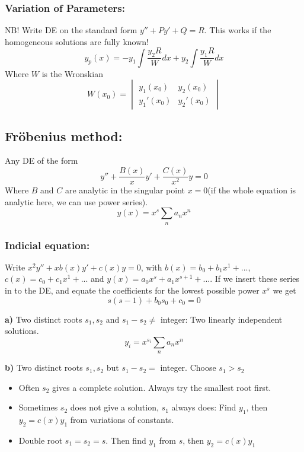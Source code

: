 \documentclass[a4paper,norsk, 10pt]{article}
\begin{document}
\subsubsection{Variation of Parameters:}
NB! Write DE on the standard form $y'' + Py' + Q = R$. This works if the homogeneous solutions are fully known!
\begin{equation}
y_p(x) = -y_1\int \frac{y_2 R}{W}dx + y_2\int \frac{y_1R}{W} dx
\end{equation}
Where $W$ is the Wronskian
\begin{equation}
W(x_0) = 
\begin{vmatrix}
y_1(x_0) & y_2(x_0)\\
y_1'(x_0) & y_2'(x_0)
\end{vmatrix}
\end{equation}
\subsection{Fröbenius method:}
Any DE of the form
\begin{equation}
y'' + \frac{B(x)}{x}y' + \frac{C(x)}{x^2}y = 0
\end{equation}
Where $B$ and $C$ are analytic in the singular point $x = 0$(if the whole equation is analytic here, we can use power series).
\begin{equation}
y(x) = x^s\sum_n a_nx^n
\end{equation}
\subsubsection{Indicial equation:}
Write $x^2y'' + xb(x)y' + c(x)y = 0$, with $b(x) = b_0 + b_1x^1 + ...$, $c(x) = c_0 + c_1x^1 + ...$ and $y(x) = a_0x^s + a_1x^{s+1} + ...$. If we insert these series in to the DE, and equate the coefficients for the lowest possible power $x^s$ we get
\begin{equation}
s(s-1) + b_0s_0+c_0 = 0
\end{equation}

\textbf{a)}
Two distinct roots $s_1,s_2$ and $s_1 - s_2 \neq $ integer: Two linearly independent solutions.
\begin{equation}
y_i = x^{s_i}\sum_na_nx^n
\end{equation}

\textbf{b)}
Two distinct roots $s_1,s_2$ but $s_1 - s_2 =$ integer. Choose $s_1 > s_2$
\begin{itemize}
\item Often $s_2$ gives a complete solution. Always try the smallest root first.
\item Sometimes $s_2$ does not give a solution, $s_1$ always does: Find $y_1$, then $y_2 = c(x)y_1$ from variations of constants.
\item Double root $s_1 = s_2 = s$. Then find $y_1$ from $s$, then $y_2 = c(x)y_1$
\end{itemize}
\end{document}
